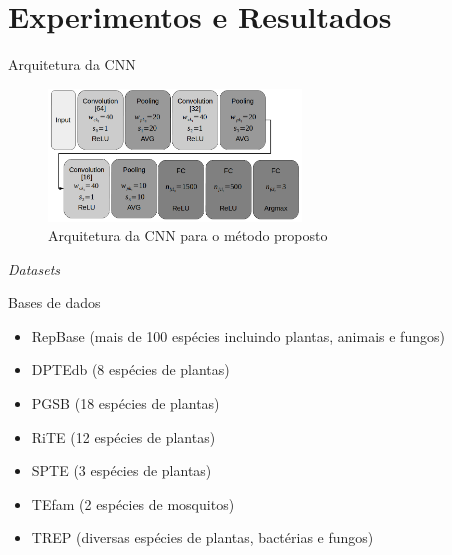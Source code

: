 \documentclass[%
  xcolor=table,%
  10pt,%
  aspectratio = 169,%
  compress,%
  t,%
]{beamer}%
\begin{document}
\section{Experimentos e Resultados}\label{sec:expres}

\begin{frame}{}{Arquitetura da CNN}
    \begin{figure}
        \centering
        \includegraphics[width=0.6\textwidth]{./Figuras/arq-4.png}
        \caption{Arquitetura da CNN para o método proposto}
        \label{fig:arc}
    \end{figure}
\end{frame}

\begin{frame}{}{\textit{Datasets}}
    \begin{block}{Bases de dados}
        \begin{itemize}
            \item RepBase \cite{repbase} (mais de 100 espécies incluindo plantas, animais e fungos)
            \item DPTEdb \cite{dpte} (8 espécies de plantas)
            \item PGSB \cite{pgsb} (18 espécies de plantas)
            \item RiTE \cite{rite} (12 espécies de plantas)
            \item SPTE \cite{spte} (3 espécies de plantas)
            \item TEfam (2 espécies de mosquitos)
            \item TREP \cite{trep} (diversas espécies de plantas, bactérias e fungos)
        \end{itemize}
    \end{block}
\end{frame}
\end{document}

